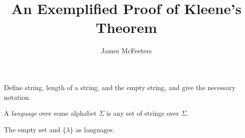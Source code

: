 \documentclass{bcthesis}
\title{An Exemplified Proof of Kleene's Theorem}
\author{James McFeeters}
\newif\ifbuildfrontmatter
\begin{document}
\ifbuildfrontmatter
\frontmatter

	\maketitle

	\begin{abstract}
		Your abstract goes here.
	\end{abstract}


	\begin{acknowledgments}
		Here you should acknowledge any special help on your project, or particular influences on your life or mathematical development.
	\end{acknowledgments}

	\tableofcontents
\fi

\mainmatter

\label{ch:basics}

	\begin{definition}[Symbol]
			
		\end{definition}

		\begin{definition}[Alphabet]

		\end{definition}

		\begin{definition}[String]
			Define string, length of a string, and the empty string, and give the necessary notation.
		\end{definition}

		\begin{definition}[Language]
			A \textit{language} over some alphabet $\Sigma$ is any set of strings over $\Sigma$.
		\end{definition}

		\begin{remark}
			The empty set and $\{ \lambda \}$ as languages.
		\end{remark}


\label{ch:regular_expressions}
\end{document}

